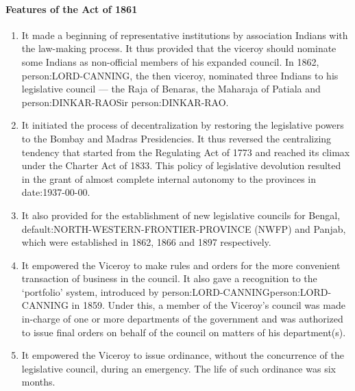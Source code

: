 \begin{multicol}{2}
\paragraph{Features of the Act of 1861}
\begin{enumerate}
  \item It made a beginning of representative institutions by association Indians with the law-making process. It thus provided that the viceroy should nominate some Indians as non-official members of his expanded council. In 1862, \gls{person:LORD-CANNING}, the then viceroy, nominated three Indians to his legislative council — the Raja of Benaras, the Maharaja of Patiala and \gls{person:DINKAR-RAO}Sir \gls{person:DINKAR-RAO}.
  \item It initiated the process of decentralization by restoring the legislative powers to the Bombay and Madras Presidencies. It thus reversed the centralizing tendency that started from the Regulating Act of 1773 and reached its climax under the Charter Act of 1833. This policy of legislative devolution resulted in the grant of almost complete internal autonomy to the provinces in \gls{date:1937-00-00}.
  \item It also provided for the establishment of new legislative councils for Bengal, \gls{default:NORTH-WESTERN-FRONTIER-PROVINCE} (NWFP) and Panjab, which were established in 1862, 1866 and 1897 respectively.
  \item It empowered the Viceroy to make rules and orders for the more convenient transaction of business in the council. It also gave a recognition to the  `portfolio' system, introduced by \gls{person:LORD-CANNING}\gls{person:LORD-CANNING} in 1859. Under this, a member of the Viceroy's council was made in-charge of one or more departments of the government and was authorized to issue final orders on behalf of the council on matters of his department(s).
  \item It empowered the Viceroy to issue ordinance, without the concurrence of the legislative council, during an emergency. The life of such ordinance was six months.
\end{enumerate}


\end{multicol}
